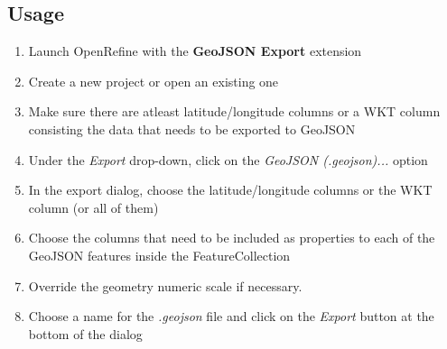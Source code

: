 \subsection{Usage}
\begin{enumerate}
    \item Launch OpenRefine with the \textbf{GeoJSON Export} extension
    \item Create a new project or open an existing one
    \item Make sure there are atleast latitude/longitude columns or a WKT column consisting the data that needs to be exported to GeoJSON
    \item Under the \textit{Export} drop-down, click on the \textit{GeoJSON (.geojson)...} option
    \item In the export dialog, choose the latitude/longitude columns or the WKT column (or all of them)
    \item Choose the columns that need to be included as properties to each of the GeoJSON features inside the FeatureCollection
    \item Override the geometry numeric scale if necessary.
    \item Choose a name for the \textit{.geojson} file and click on the \textit{Export} button at the bottom of the dialog
\end{enumerate}
